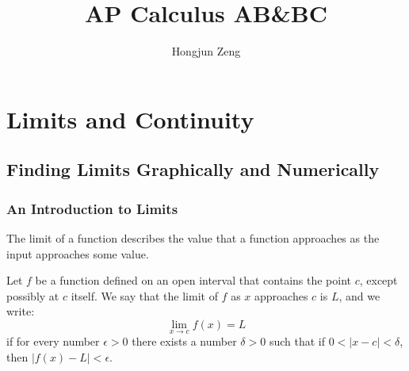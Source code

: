 \documentclass[12pt]{article}
\theoremstyle{beautifulthm}
\begin{document}
\title{AP Calculus AB\&BC}
\author{Hongjun Zeng}
\maketitle

\lipsum[1-10] 

\newpage
\tableofcontents

\newpage
\section{Limits and Continuity}
\subsection{Finding Limits Graphically and Numerically}
\subsubsection*{An Introduction to Limits}

The limit of a function describes the value that a function approaches as the input approaches some value.


\begin{Definition}{}{}
Let \( f \) be a function defined on an open interval that contains the point \( c \), except possibly at \( c \) itself. We say that the limit of \( f \) as \( x \) approaches \( c \) is \( L \), and we write:
\[
\lim_{x \to c} f(x) = L
\]
if for every number \( \epsilon > 0 \) there exists a number \( \delta > 0 \) such that if \( 0 < |x - c| < \delta \), then \( |f(x) - L| < \epsilon \).
\end{Definition}
\end{document}
